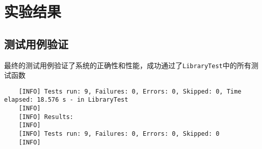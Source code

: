 \documentclass{ctexart}
\begin{document}
\section{实验结果}
\subsection{测试用例验证}
最终的测试用例验证了系统的正确性和性能，成功通过了\texttt{LibraryTest}中的所有测试函数
\begin{lstlisting}
    [INFO] Tests run: 9, Failures: 0, Errors: 0, Skipped: 0, Time elapsed: 18.576 s - in LibraryTest
    [INFO] 
    [INFO] Results:
    [INFO]
    [INFO] Tests run: 9, Failures: 0, Errors: 0, Skipped: 0
    [INFO]
\end{lstlisting}
\end{document}
